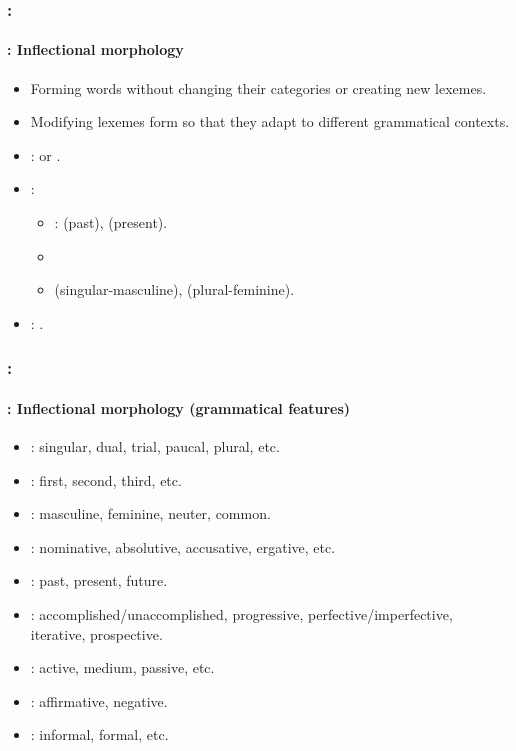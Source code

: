 \documentclass[xcolor=table]{beamer}
\begin{document}
\begin{frame}
	\frametitle{\insertshortsubtitle: \insertsection}
	\framesubtitle{\insertsubsection: Inflectional morphology}

	\begin{itemize}
		\item Forming words without changing their categories or creating new lexemes.
		\item Modifying lexemes form so that they adapt to different grammatical contexts.
		\item {}:  or .
		\item {}:
		\begin{itemize}
			\item {}:  (past),  (present).
			\item {}
			\item {}  (singular-masculine),  (plural-feminine).
		\end{itemize}
		\item {}: .
		
	\end{itemize}

\end{frame}

\begin{frame}
	\frametitle{\insertshortsubtitle: \insertsection}
	\framesubtitle{\insertsubsection: Inflectional morphology (grammatical features)}

	\begin{itemize}
		\item {}: singular, dual, trial, paucal, plural, etc. 
		\item {}: first, second, third, etc.
		\item {}: masculine, feminine, neuter, common.
		\item {}: nominative, absolutive, accusative, ergative, etc.
		\item {}: past, present, future.
		\item {}: accomplished/unaccomplished, progressive, perfective/imperfective, iterative, prospective.
		\item {}: active, medium, passive, etc.
		\item {}: affirmative, negative.
		\item {}: informal, formal, etc.
	\end{itemize}

\end{frame}
\end{document}

